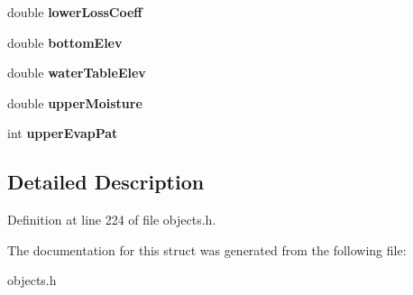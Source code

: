 \begin{DoxyCompactItemize}
double {\bfseries lower\+Loss\+Coeff}
\item 
\mbox{\label{struct_t_aquifer_a1766edc8440413e0b83324b21b444671}} 
double {\bfseries bottom\+Elev}
\item 
\mbox{\label{struct_t_aquifer_a3325fd2fdddfac2519ea949bade4b0c7}} 
double {\bfseries water\+Table\+Elev}
\item 
\mbox{\label{struct_t_aquifer_adde7272ca55fb10e995c31af1708436f}} 
double {\bfseries upper\+Moisture}
\item 
\mbox{\label{struct_t_aquifer_a9ad7d6984bdb9697b00bc8daa1f4dd00}} 
int {\bfseries upper\+Evap\+Pat}
\end{DoxyCompactItemize}


\subsection{Detailed Description}


Definition at line 224 of file objects.\+h.



The documentation for this struct was generated from the following file\+:\begin{DoxyCompactItemize}
\item 
objects.\+h\end{DoxyCompactItemize}
